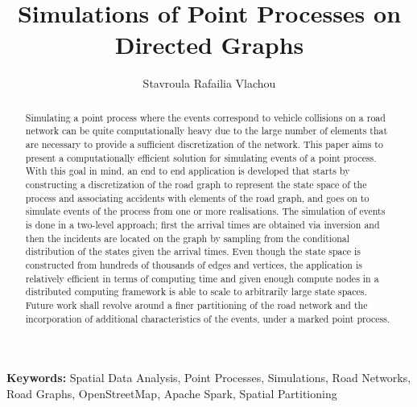 \documentclass[12pt]{article}
\title{\textbf{Simulations of Point Processes on Directed Graphs}}
\author{Stavroula Rafailia Vlachou}
\newcommand\blankpage{%
    \null
    \thispagestyle{empty}%
    \addtocounter{page}{-1}%
    \newpage}
\theoremstyle{definition}
\begin{document}
\maketitle
\newpage 
\begin{abstract}
  Simulating a point process where the events correspond to vehicle collisions on a road network can be quite computationally heavy due to the large number of elements that are necessary to provide a sufficient discretization of the network. This paper aims to present a computationally efficient solution for simulating events of a point process. With this goal in mind, an end to end application is developed that starts by constructing a discretization of the road graph to represent the state space of the process and associating accidents with elements of the road graph, and goes on to simulate events of the process from one or more realisations. The simulation of events is done in a two-level approach; first the arrival times are obtained via inversion and then the incidents are located on the graph by sampling from the conditional distribution of the states given the arrival times. Even though the state space is constructed from hundreds of thousands of edges and vertices, the application is relatively efficient in terms of computing time and given enough compute nodes in a distributed computing framework is able to scale to arbitrarily large state spaces. Future work shall revolve around a finer partitioning of the road network and the incorporation of additional characteristics of the events, under a marked point process. 

\end{abstract}
\begin{center}
    \textbf{Keywords:} Spatial Data Analysis, Point Processes, Simulations, Road Networks, Road Graphs, OpenStreetMap, Apache Spark, Spatial Partitioning  
\end{center}
\newpage

\tableofcontents
\newpage 
\end{document}
